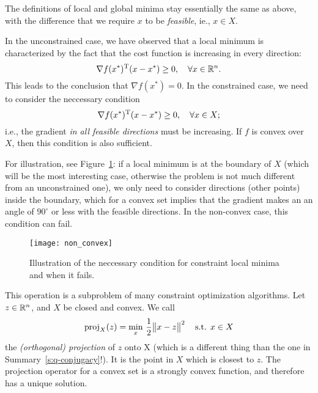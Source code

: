 \documentclass{article}
\begin{document}
The definitions of local and global minima stay essentially the same as above, with the difference
that we require \(x\) to be \emph{feasible}, ie., \(x \in X\).


\label{s:constrained-optimality}

In the unconstrained case, we have observed that a local minimum is characterized by the fact that
the cost function is increasing in every direction:
\begin{equation*}
  \nabla f(x^*)^{\mathrm{T}}(x - x^*) \geq 0, \quad\forall x \in \mathbb{R}^n.
\end{equation*}
This leads to the conclusion that \(\nabla f(x^*) = 0\). In the constrained case, we need to
consider the neccessary condition
\begin{equation*}
  \nabla f(x^*)^{\mathrm{T}}(x - x^*) \geq 0, \quad\forall x \in X;
\end{equation*}
i.e., the gradient \emph{in all feasible directions} must be increasing.  If \(f\) is convex
over \(X\), then this condition is also sufficient.

For illustration, see Figure~\ref{fig:non-convex}: if a local minimum is at the boundary of \(X\)
(which will be the most interesting case, otherwise the problem is not much different from an
unconstrained one), we only need to consider directions (other points) inside the boundary, which
for a convex set implies that the gradient makes an an angle of \(90^\circ\) or less with the
feasible directions.  In the non-convex case, this condition can fail.

\begin{figure}[H]
  \centering
  \texttt{[image: non\_convex]}
  \caption{Illustration of the neccessary condition for constraint local minima and when it
    fails.\label{fig:non-convex}}
\end{figure}


\label{s:projection-operator}

This operation is a subproblem of many constraint optimization algorithms.  Let \(z \in \mathbb{R}^n\), and
\(X\) be closed and convex.  We call
\begin{equation*}
  \proj_X(z) = \min_{x}\, \frac{1}{2}\enVert[1]{x - z}^2 \quad\text{s.t. } x \in X
\end{equation*}
the \emph{(orthogonal) projection} of \(z\) onto X (which is a different thing than the one in
Summary~\ref{s:q-conjugacy}!).  It is the point in \(X\) which is closest to \(z\).  The projection
operator for a convex set is a strongly convex function, and therefore has a unique solution.
\end{document}
